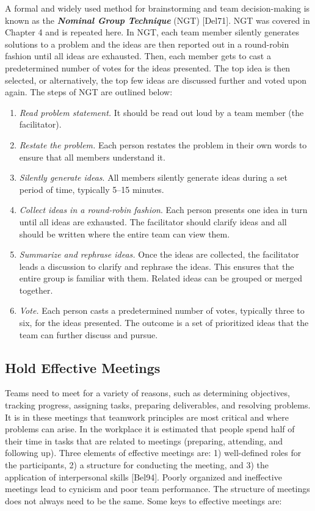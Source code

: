 A formal and widely used method for brainstorming and team
decision-making is known as the \emph{\textbf{Nominal Group Technique}}
(NGT) {[}Del71{]}. NGT was covered in Chapter 4 and is repeated here. In
NGT, each team member silently generates solutions to a problem and the
ideas are then reported out in a round-robin fashion until all ideas are
exhausted. Then, each member gets to cast a predetermined number of
votes for the ideas presented. The top idea is then selected, or
alternatively, the top few ideas are discussed further and voted upon
again. The steps of NGT are outlined below:

\begin{enumerate}
\def\labelenumi{\arabic{enumi}.}
\item
  \emph{Read problem statement.} It should be read out loud by a team
  member (the facilitator).
\item
  \emph{Restate the problem.} Each person restates the problem in their
  own words to ensure that all members understand it.
\item
  \emph{Silently generate ideas}. All members silently generate ideas
  during a set period of time, typically 5­--15 minutes.
\item
  \emph{Collect ideas in a round-robin fashion}. Each person presents
  one idea in turn until all ideas are exhausted. The facilitator should
  clarify ideas and all should be written where the entire team can view
  them.
\item
  \emph{Summarize and rephrase ideas.} Once the ideas are collected, the
  facilitator leads a discus­sion to clarify and rephrase the ideas. This
  ensures that the entire group is familiar with them. Related ideas can
  be grouped or merged together.
\item
  \emph{Vote.} Each person casts a predetermined number of votes,
  typically three to six, for the ideas presented. The outcome is a set
  of prioritized ideas that the team can further discuss and pursue.
\end{enumerate}

\subsection{Hold Effective Meetings}
\label{subsection:hold-effective-meetings}

Teams need to meet for a variety of reasons, such as determining
objectives, tracking progress, assigning tasks, preparing deliverables,
and resolving problems. It is in these meetings that teamwork principles
are most critical and where problems can arise. In the workplace it is
estimated that people spend half of their time in tasks that are related
to meetings (preparing, attending, and following up). Three elements of
effective meetings are: 1) well-defined roles for the participants, 2) a
structure for conducting the meeting, and 3) the application of
interpersonal skills {[}Bel94{]}. Poorly organized and ineffective
meetings lead to cynicism and poor team performance. The structure of
meetings does not always need to be the same. Some keys to effective
meetings are:

